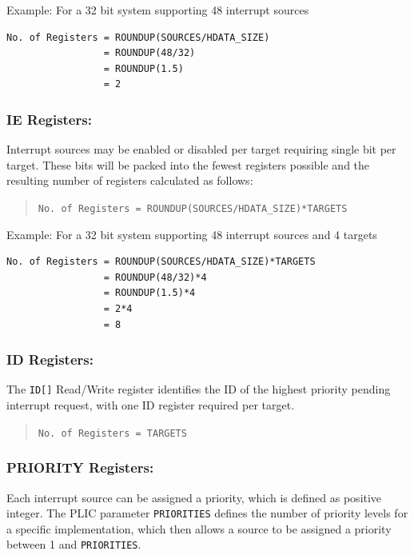 Example: For a 32 bit system supporting 48 interrupt sources

\begin{verbatim}
No. of Registers = ROUNDUP(SOURCES/HDATA_SIZE)   
                 = ROUNDUP(48/32)
                 = ROUNDUP(1.5)
                 = 2
\end{verbatim}

\subsubsection{IE Registers:}

Interrupt sources may be enabled or disabled per target requiring single
bit per target. These bits will be packed into the fewest registers
possible and the resulting number of registers calculated as follows:

\begin{quote}
\texttt{No.\ of\ Registers\ =\ ROUNDUP(SOURCES/HDATA\_SIZE)*TARGETS}
\end{quote}

Example: For a 32 bit system supporting 48 interrupt sources and 4
targets

\begin{verbatim}
No. of Registers = ROUNDUP(SOURCES/HDATA_SIZE)*TARGETS
                 = ROUNDUP(48/32)*4
                 = ROUNDUP(1.5)*4
                 = 2*4
                 = 8
\end{verbatim}

\subsubsection{ID Registers:}

The \texttt{ID[]} Read/Write
register identifies the ID of the highest priority pending interrupt
request, with one ID register required per target.

\begin{quote}
\texttt{No.\ of\ Registers\ =\ TARGETS}
\end{quote}

\subsubsection{PRIORITY Registers:}

Each interrupt source can be assigned a priority, which is defined as
positive integer. The PLIC parameter \texttt{PRIORITIES} defines the
number of priority levels for a specific implementation, which then
allows a source to be assigned a priority between 1 and
\texttt{PRIORITIES}.

